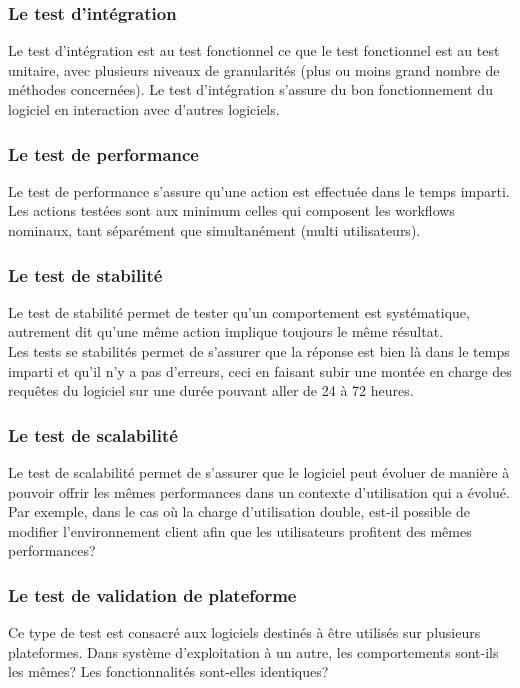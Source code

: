 \subsubsection{Le test d'int\'{e}gration}
Le test d'int\'{e}gration est au test fonctionnel ce que le test fonctionnel est au test unitaire, avec plusieurs niveaux de granularit\'{e}s (plus ou moins grand nombre de m\'{e}thodes concern\'{e}es). Le test d'int\'{e}gration s'assure du bon fonctionnement du logiciel en interaction avec d'autres logiciels.

\subsubsection{Le test de performance}
Le test de performance s'assure qu'une action est effectu\'{e}e dans le temps imparti. Les actions test\'{e}es sont aux minimum celles qui composent les workflows nominaux, tant s\'{e}par\'{e}ment que simultan\'{e}ment (multi utilisateurs).

\subsubsection{Le test de stabilit\'{e}}
Le test de stabilit\'{e} permet de tester qu'un comportement est syst\'{e}matique, autrement dit qu'une m\^{e}me action implique toujours le m\^{e}me r\'{e}sultat.\\
Les tests se stabilit\'{e}s permet de s'assurer que la r\'{e}ponse est bien l\`{a} dans le temps imparti et qu'il n'y a pas d'erreurs, ceci en faisant subir une mont\'{e}e en charge des requ\^{e}tes du logiciel sur une dur\'{e}e pouvant aller de 24 \`{a} 72 heures.

\subsubsection{Le test de scalabilit\'{e}}
Le test de scalabilit\'{e} permet de s'assurer que le logiciel peut \'{e}voluer de mani\`{e}re \`{a} pouvoir offrir les m\^{e}mes performances dans un contexte d'utilisation qui a \'{e}volu\'{e}. Par exemple, dans le cas o\`{u} la charge d'utilisation double, est-il possible de modifier l'environnement client afin que les utilisateurs profitent des m\^{e}mes performances?


\subsubsection{Le test de validation de plateforme}
Ce type de test est consacr\'{e} aux logiciels destin\'{e}s \`{a} \^{e}tre utilis\'{e}s sur plusieurs plateformes. Dans syst\`{e}me d'exploitation \`{a} un autre, les comportements sont-ils les m\^{e}mes? Les fonctionnalit\'{e}s sont-elles identiques?


